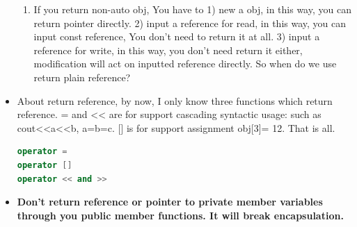 \documentclass[a4paper,12pt,twoside]{book}
\begin{document}
\begin{itemize}
\begin{enumerate}
\item If you return non-auto obj, You have to 1) new a obj, in this way, you can return pointer directly. 2) input a reference for read, in this way, you can input const reference, You don't need to return it at all. 3) input a reference for write, in this way, you don't need return it either, modification will act on inputted reference directly. So when do we use return plain reference?
\end{enumerate}

\item About return reference, by now, I only know three functions which return reference. = and << are for support cascading syntactic usage: such as cout<<a<<b, a=b=c.  [] is for support assignment obj[3]= 12.  That is all.
\begin{lstlisting}[frame=single, language=c++]
operator =
operator []
operator << and >>
\end{lstlisting}

\item \textbf{Don't return reference or pointer to private member variables through you public member functions. It will break encapsulation. }

\end{itemize}
\end{document}
